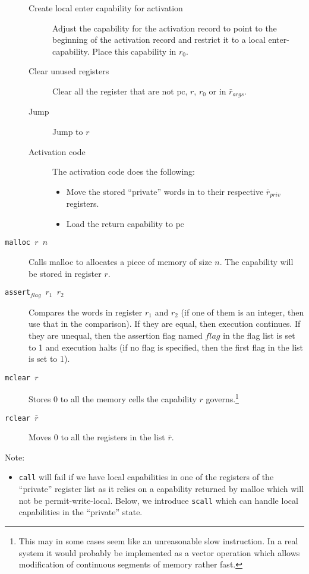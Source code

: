 \documentclass[a4paper]{article}
\newcommand{\var}[1]{\mathit{#1}}
\newcommand{\pcreg}{\mathrm{pc}}
\begin{document}
\begin{description}
\begin{description}
                \item [Create local enter capability for activation] Adjust the capability for the activation record to point to the beginning of the activation record and restrict it to a local enter-capability. Place this capability in $r_0$.
                \item [Clear unused registers]
                  Clear all the register that are not $\pcreg$, $r$, $r_0$ or in $\bar{r}_{\var{args}}$.
                \item [Jump] Jump to $r$
                \item [Activation code] The activation code does the following:
                  \begin{itemize}
                  \item Move the stored ``private'' words in to their respective $\bar{r}_{\var{priv}}$ registers.
                  \item Load the return capability to $\pcreg$
                  \end{itemize}
                \end{description}
              \item[\texttt{malloc $r$ $n$}] Calls malloc to allocates a piece of memory of size $n$. The capability will be stored in register $r$.

              \item[\texttt{assert$_{\var{flag}}$ $r_1$ $r_2$}] Compares the words in register $r_1$ and $r_2$ (if one of them is an integer, then use that in the comparison). If they are equal, then execution continues. If they are unequal, then the assertion flag named $\var{flag}$ in the flag list is set to 1 and execution halts (if no flag is specified, then the first flag in the list is set to 1).
              \item[\texttt{mclear $r$}] Stores 0 to all the memory cells the capability $r$ governs.\footnote{This may in some cases seem like an unreasonable slow instruction. In a real system it would probably be implemented as a vector operation which allows modification of continuous segments of memory rather fast.}
              \item[\texttt{rclear $\bar{r}$}] Moves 0 to all the registers in the list $\bar{r}$.
              \end{description}
              Note:
              \begin{itemize}
              \item \texttt{call} will fail if we have local capabilities in one of the registers of the ``private'' register list as it relies on a capability returned by malloc which will not be permit-write-local. Below, we introduce \texttt{scall} which can handle local capabilities in the ``private'' state.
              \end{itemize}
\end{document}
